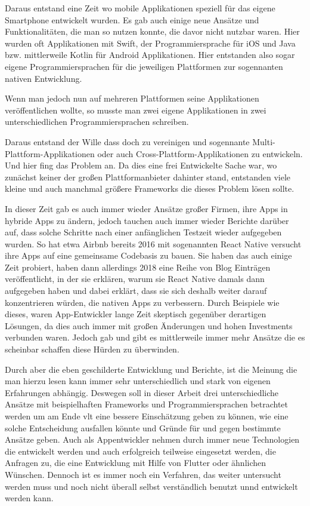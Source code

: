 Daraus entstand eine Zeit wo mobile Applikationen speziell für das eigene Smartphone entwickelt wurden. Es gab auch einige neue Ansätze und Funktionalitäten, die man so nutzen konnte, die davor nicht nutzbar waren. Hier wurden oft Applikationen mit Swift, der Programmiersprache für iOS und Java bzw. mittlerweile Kotlin für Android Applikationen. Hier entstanden also sogar eigene Programmiersprachen für die jeweiligen Plattformen zur sogennanten nativen Entwicklung.

Wenn man jedoch nun auf mehreren Plattformen seine Applikationen veröffentlichen wollte, so musste man zwei eigene Applikationen in zwei unterschiedlichen Programmiersprachen schreiben. 

Daraus entstand der Wille dass doch zu vereinigen und 
sogennante Multi-Plattform-Applikationen oder auch Cross-Plattform-Applikationen zu entwickeln.
Und hier fing das Problem an. Da dies eine frei Entwickelte Sache war, wo zunächst keiner der großen Plattformanbieter dahinter stand, entstanden viele kleine und auch manchmal größere Frameworks die dieses Problem lösen sollte.

In dieser Zeit gab es auch immer wieder Ansätze großer Firmen, ihre Apps in hybride Apps zu ändern, jedoch tauchen auch immer wieder Berichte darüber auf, dass solche Schritte nach einer anfänglichen Testzeit wieder aufgegeben wurden. So hat etwa Airbnb bereits 2016 mit sogenannten React Native versucht ihre Apps auf eine gemeinsame Codebasis zu bauen. Sie haben das auch einige Zeit probiert, haben dann allerdings 2018 eine Reihe von Blog Einträgen veröffentlicht, in der sie erklären, warum sie React Native damals dann aufgegeben haben und dabei erklärt, dass sie sich deshalb weiter darauf konzentrieren würden, die nativen Apps zu verbessern. 
Durch Beispiele wie dieses, waren App-Entwickler lange Zeit skeptisch gegenüber derartigen Lösungen, da dies auch immer mit großen Änderungen und hohen Investments verbunden waren.
Jedoch gab und gibt es mittlerweile immer mehr Ansätze die es scheinbar schaffen diese Hürden zu überwinden.
\cite{MaiThiNguyenKim.}

Durch aber die eben geschilderte Entwicklung und Berichte, ist die Meinung die man hierzu lesen kann immer sehr unterschiedlich und stark von eigenen Erfahrungen abhängig. 
Deswegen soll in dieser Arbeit drei unterschiedliche Ansätze mit beispielhaften Frameworks und Programmiersprachen betrachtet werden um am Ende vlt eine bessere Einschätzung geben zu können, wie eine solche Entscheidung ausfallen könnte und Gründe für und gegen bestimmte Ansätze geben.
Auch als Appentwickler nehmen durch immer neue Technologien die entwickelt werden und auch erfolgreich teilweise eingesetzt werden, die Anfragen zu, die eine Entwicklung mit Hilfe von Flutter oder ähnlichen Wünschen. Dennoch ist es immer noch ein Verfahren, das weiter untersucht werden muss und noch nicht überall selbst verständlich benutzt unnd entwickelt werden kann.

